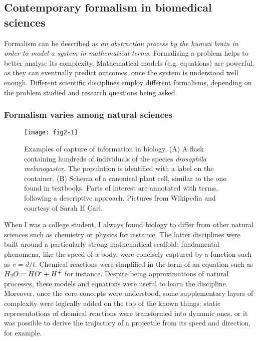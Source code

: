 \subsection{Contemporary formalism in biomedical sciences}

Formalism can be described as \emph{an abstraction process by the human brain in order to model a system in mathematical terms}. Formalising a problem helps to better analyse its complexity. Mathematical models (e.g. equations) are powerful, as they can eventually predict outcomes, once the system is understood well enough. Different scientific disciplines employ different formalisms, depending on the problem studied and research questions being asked.

\subsubsection{Formalism varies among natural sciences}

\begin{figure}[ht]
    \centering
    \texttt{[image: fig2-1]}
    \caption{Examples of capture of information in biology. (A) A flask containing hundreds of individuals of the species \emph{drosophila melanogaster}. The population is identified with a label on the container. (B) Schema of a  canonical plant cell, similar to the one found in textbooks. Parts of interest are annotated with terms, following a descriptive approach. Pictures from Wikipedia and courtesy of Sarah H Carl.}
    \label{fig2-1}
\end{figure}

When I was a college student, I always found biology to differ from other natural sciences such as chemistry or physics for instance. The latter disciplines were built around a particularly strong mathematical scaffold; fundamental phenomena, like the speed of a body, were concisely captured by a function such as $ v=d/t $. Chemical reactions were simplified in the form of an equation such as $ H_{2}O = HO \textsuperscript{-} + H \textsuperscript{+} $ for instance. Despite being approximations of natural processes, these models and equations were useful to learn the discipline. Moreover, once the core concepts were understood, some supplementary layers of complexity were logically added on the top of the known things: static representations of chemical reactions were transformed into dynamic ones, or it was possible to derive the trajectory of a projectile from its speed and direction, for example.

